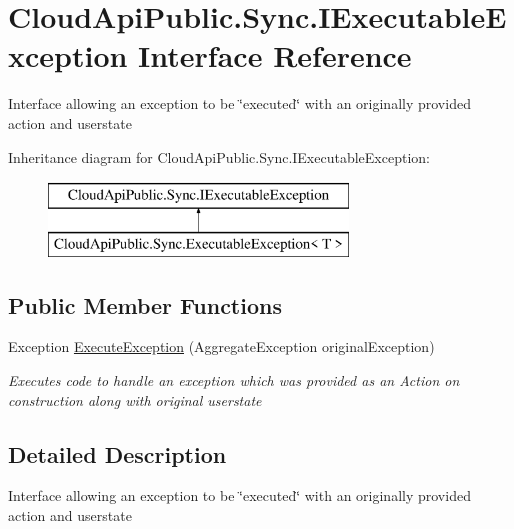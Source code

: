 \hypertarget{interface_cloud_api_public_1_1_sync_1_1_i_executable_exception}{\section{Cloud\-Api\-Public.\-Sync.\-I\-Executable\-Exception Interface Reference}
\label{interface_cloud_api_public_1_1_sync_1_1_i_executable_exception}
}


Interface allowing an exception to be \char`\"{}executed\char`\"{} with an originally provided action and userstate  


Inheritance diagram for Cloud\-Api\-Public.\-Sync.\-I\-Executable\-Exception\-:\begin{figure}[H]
\begin{center}
\leavevmode
\includegraphics[height=2.000000cm]{interface_cloud_api_public_1_1_sync_1_1_i_executable_exception}
\end{center}
\end{figure}
\subsection*{Public Member Functions}
\begin{DoxyCompactItemize}
\item 
Exception \hyperlink{interface_cloud_api_public_1_1_sync_1_1_i_executable_exception_aba847c78adff005e30f9ab156995483f}{Execute\-Exception} (Aggregate\-Exception original\-Exception)
\begin{DoxyCompactList}\small\item\em Executes code to handle an exception which was provided as an Action on construction along with original userstate \end{DoxyCompactList}\end{DoxyCompactItemize}


\subsection{Detailed Description}
Interface allowing an exception to be \char`\"{}executed\char`\"{} with an originally provided action and userstate 



